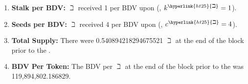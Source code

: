 \documentclass[class=article, crop=false]{standalone}
\begin{document}
\begin{enumerate}
        \item \textbf{Stalk per BDV:} \hyperlink{ht25}{$\beth$}  received 1  per BDV upon  (, $k^{\hyperlink{ht25}{\beth}} = 1$).
        \item \textbf{Seeds per BDV:} \hyperlink{ht25}{$\beth$}  received 4  per BDV upon  (, $c^{\hyperlink{ht25}{\beth}} = 4$).
        \item \textbf{Total Supply:} There were 0.540894218294675521 \hyperlink{ht25}{$\beth$} at the end of the block prior to the .
        \item \textbf{BDV Per Token:} The BDV per \hyperlink{ht25}{$\beth$} at the end of the block prior to the  was 119,894,802.186829.
    \end{enumerate}

\newpage
\end{document}

